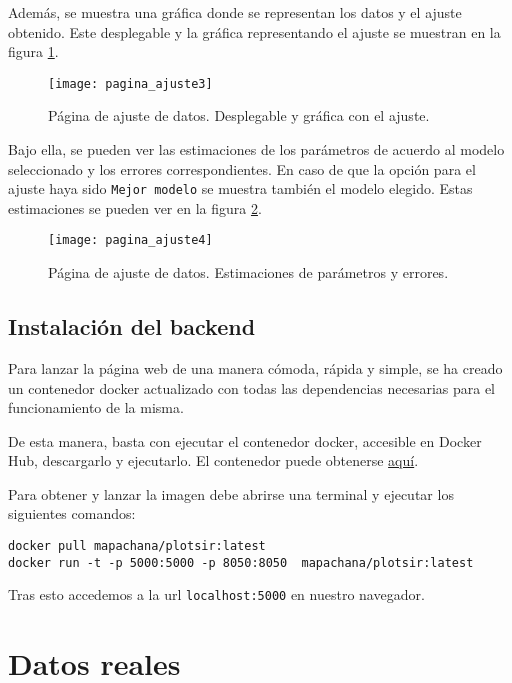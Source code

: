 Además, se muestra una gráfica donde se representan los datos y el ajuste obtenido. Este desplegable y la gráfica representando el ajuste se muestran en la figura \ref{manual: ajuste3}.

\begin{figure}
\begin{center}
\caption{Página de ajuste de datos. Desplegable y gráfica con el ajuste.}
\label{manual: ajuste3}
\texttt{[image: pagina\_ajuste3]}
\end{center}
\end{figure}

Bajo ella, se pueden ver las estimaciones de los parámetros de acuerdo al modelo seleccionado y los errores correspondientes. En caso de que la opción para el ajuste haya sido \verb|Mejor modelo| se muestra también el modelo elegido. Estas estimaciones se pueden ver en la figura \ref{manual: ajuste4}.

\begin{figure}
\begin{center}
\caption{Página de ajuste de datos. Estimaciones de parámetros y errores.}
\label{manual: ajuste4}
\texttt{[image: pagina\_ajuste4]}
\end{center}
\end{figure}


\subsection{Instalación del backend}

Para lanzar la página web de una manera cómoda, rápida y simple, se ha creado un contenedor docker actualizado con todas las dependencias necesarias para el funcionamiento de la misma.

De esta manera, basta con ejecutar el contenedor docker, accesible en Docker Hub, descargarlo y ejecutarlo. El contenedor puede obtenerse \href{https://hub.docker.com/repository/docker/mapachana/plotsir}{aquí}.

Para obtener y lanzar la imagen debe abrirse una terminal y ejecutar los siguientes comandos:

\begin{verbatim}
docker pull mapachana/plotsir:latest
docker run -t -p 5000:5000 -p 8050:8050  mapachana/plotsir:latest
\end{verbatim}

Tras esto accedemos a la url \verb|localhost:5000| en nuestro navegador.


\section{Datos reales}

